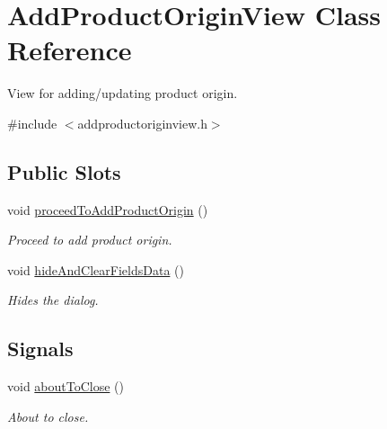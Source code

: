\hypertarget{class_add_product_origin_view}{\section{\-Add\-Product\-Origin\-View \-Class \-Reference}
\label{class_add_product_origin_view}
}


\-View for adding/updating product origin.  




{\ttfamily \#include $<$addproductoriginview.\-h$>$}

\subsection*{\-Public \-Slots}
\begin{DoxyCompactItemize}
\item 
void \hyperlink{class_add_product_origin_view_a2bd0c50377025889494fa3523f333dc1}{proceed\-To\-Add\-Product\-Origin} ()
\begin{DoxyCompactList}\small\item\em \-Proceed to add product origin. \end{DoxyCompactList}\item 
void \hyperlink{class_add_product_origin_view_a7286841e68b75a61e973faa88a4471d9}{hide\-And\-Clear\-Fields\-Data} ()
\begin{DoxyCompactList}\small\item\em \-Hides the dialog. \end{DoxyCompactList}\end{DoxyCompactItemize}
\subsection*{\-Signals}
\begin{DoxyCompactItemize}
\item 
void \hyperlink{class_add_product_origin_view_aabc32d2cfd2d2c9095e89ad58ea6334d}{about\-To\-Close} ()
\begin{DoxyCompactList}\small\item\em \-About to close. \end{DoxyCompactList}\end{DoxyCompactItemize}

